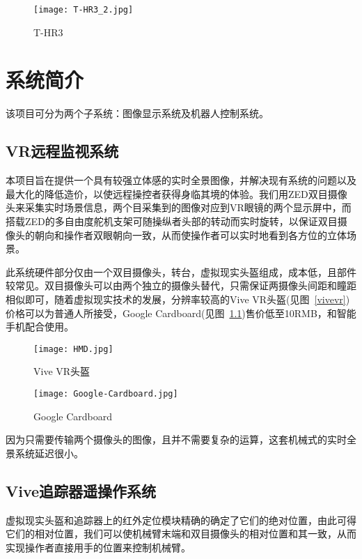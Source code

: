 \begin{figure}[htbp]
\small
\centering
\texttt{[image: T-HR3\_2.jpg]}
\caption{T-HR3} 
\end{figure}




\chapter{系统简介}

该项目可分为两个子系统：图像显示系统及机器人控制系统。
	
	\section{VR远程监视系统}
本项目旨在提供一个具有较强立体感的实时全景图像，并解决现有系统的问题以及最大化的降低造价，以使远程操控者获得身临其境的体验。我们用ZED双目摄像头来采集实时场景信息，两个目采集到的图像对应到VR眼镜的两个显示屏中，而搭载ZED的多自由度舵机支架可随操纵者头部的转动而实时旋转，以保证双目摄像头的朝向和操作者双眼朝向一致，从而使操作者可以实时地看到各方位的立体场景。
	
此系统硬件部分仅由一个双目摄像头，转台，虚拟现实头盔组成，成本低，且部件较常见。双目摄像头可以由两个独立的摄像头替代，只需保证两摄像头间距和瞳距相似即可，随着虚拟现实技术的发展，分辨率较高的Vive VR头盔(见图~\ref{vivevr})价格可以为普通人所接受，Google Cardboard(见图~\ref{card})售价低至10RMB，和智能手机配合使用。
\begin{figure}
\begin{minipage}{0.48\textwidth}
  \centering
  \texttt{[image: HMD.jpg]}
  \caption{Vive VR头盔}
  \label{vivevr}
\end{minipage}\hfill
\begin{minipage}{0.48\textwidth}
  \centering
  \texttt{[image: Google-Cardboard.jpg]}
  \caption{Google Cardboard}
  \label{card}
\end{minipage}
\end{figure}

因为只需要传输两个摄像头的图像，且并不需要复杂的运算，这套机械式的实时全景系统延迟很小。

\section{Vive追踪器遥操作系统}

虚拟现实头盔和追踪器上的红外定位模块精确的确定了它们的绝对位置，由此可得它们的相对位置，我们可以使机械臂末端和双目摄像头的相对位置和其一致，从而实现操作者直接用手的位置来控制机械臂。

